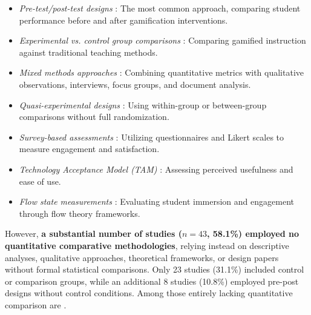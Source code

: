 \documentclass[a4paper,fleqn]{cas-sc}
\begin{document}
\begin{itemize}[noitemsep]
 \item \textit{Pre-test/post-test designs} \citep{1Barbatsis201159, 8Yu2014, 9Lin2018, 16Chen201447, 19Chou2019, 24Ghannem2019, 28Chao201734, 35Fernandez2023, 43ali2018indonesian, 52Lin2011265, 63Liu2021, 64Hsu201324, 77Ramansyah2021}: The most common approach, comparing student performance before and after gamification interventions.
 
 \item \textit{Experimental vs. control group comparisons} \citep{24Ghannem2019, 28Chao201734, 35Fernandez2023, 41Petersen2023301, 52Lin2011265, 53Perez2014, 55Squire2004, 72hutauruk2020utilization, 73Wolfartsberger2011160}: Comparing gamified instruction against traditional teaching methods.
 
 \item \textit{Mixed methods approaches} \citep{3Watson2011466, 46Stirling2022, 71lynch2015pedagogical}: Combining quantitative metrics with qualitative observations, interviews, focus groups, and document analysis.
 
 \item \textit{Quasi-experimental designs} \citep{11Ternblad2023115, 41Petersen2023301, 72hutauruk2020utilization}: Using within-group or between-group comparisons without full randomization.
 
 \item \textit{Survey-based assessments} \citep{4Cruz2017, 6Czerwinski2018, 13Humpire2022, 19Chou2019, 34Serrano2023, 43ali2018indonesian, 44Shiue2016}: Utilizing questionnaires and Likert scales to measure engagement and satisfaction.
 
 \item \textit{Technology Acceptance Model (TAM)} \citep{24Ghannem2019, 44Shiue2016, 45Yu2016727}: Assessing perceived usefulness and ease of use.
 
 \item \textit{Flow state measurements} \citep{5kazanidis2018alpha, 16Chen201447, 39Tegos2014838, 45Yu2016727, 52Lin2011265, 63Liu2021, 70Hou201519}: Evaluating student immersion and engagement through flow theory frameworks.
\end{itemize}

However, \textbf{a substantial number of studies ($n=43$, 58.1\%) employed no quantitative comparative methodologies}, relying instead on descriptive analyses, qualitative approaches, theoretical frameworks, or design papers without formal statistical comparisons. Only 23 studies (31.1\%) included control or comparison groups, while an additional 8 studies (10.8\%) employed pre-post designs without control conditions. Among those entirely lacking quantitative comparison are \citet{4Cruz2017, 10Huaman2019220, 14Forsyth2023, 17Manzanares2019, 18Shih201054, 20Erandaru2014, 21Ghulamani2017, 22Nugroho2020149, 25Repantis2011502, 30Zin2008, 46Stirling2022, 50Lye2013, 51Ardito2007, 55Squire2004, 75trajano2014using, 77Ramansyah2021, 78Rouse2022357}.
\end{document}
